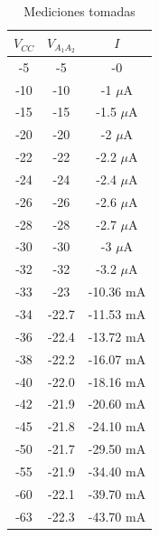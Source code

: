 \begin{minipage}[t]{0.5\linewidth}
  \begin{table}[H] %
    \begin{center}
      \begin{tabular}{c|c|c}
        $V_{CC}$ &$V_{A_1A_2}$ &$I$  \\
        \hline
        -5    &-5    &-0     \\
        -10    &-10   &-1    $\mu$A\\
        -15    &-15   &-1.5  $\mu$A\\
        -20    &-20   &-2    $\mu$A\\
        -22    &-22   &-2.2  $\mu$A\\
        -24    &-24   &-2.4  $\mu$A\\
        -26    &-26   &-2.6  $\mu$A\\
        -28    &-28   &-2.7  $\mu$A\\
        -30    &-30   &-3    $\mu$A\\
        -32    &-32   &-3.2  $\mu$A\\
        -33    &-23   &-10.36 mA\\
        -34    &-22.7 &-11.53 mA\\
        -36    &-22.4 &-13.72 mA\\
        -38    &-22.2 &-16.07 mA\\
        -40    &-22.0 &-18.16 mA\\
        -42    &-21.9 &-20.60 mA\\
        -45    &-21.8 &-24.10 mA \\
        -50    &-21.7 &-29.50 mA \\
        -55    &-21.9 &-34.40 mA \\
        -60    &-22.1 &-39.70  mA \\
        -63    &-22.3 &-43.70  mA \\
      \end{tabular}
    \end{center} 
    \caption{Mediciones tomadas}
  \end{table}
\end{minipage}



